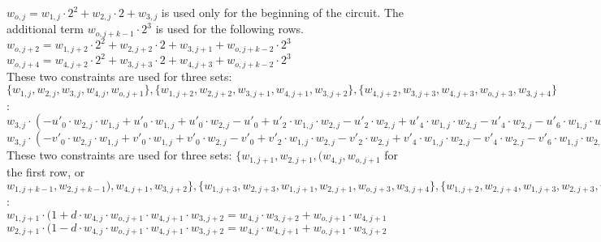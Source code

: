 \begin{center}
$w_{o, j } = w_{1,j} \cdot 2^2 + w_{2,j} \cdot 2 + w_{3, j}$ is used only for the beginning of the circuit. The additional term $w_{o, j+k - 1} \cdot 2^3$ is used for the following rows. \\
$w_{o, j + 2} = w_{1,j + 2} \cdot 2^2 + w_{2,j + 2} \cdot 2 + w_{3, j + 1} + w_{o, j+k - 2} \cdot 2^3$ \\
$w_{o, j + 4} = w_{4,j + 2} \cdot 2^2 + w_{3,j + 3} \cdot 2 + w_{4, j + 3} + w_{o, j+k - 2} \cdot 2^3$ \\


These two constraints are used for three sets: $\{ w_{1,j}, w_{2,j}, w_{3,j}, w_{4,j}, w_{o, j+1} \}, \{ w_{1, j+2}, w_{2, j +2}, w_{3, j+1}, w_{4, j+1}, w_{3, j+2}\}, \{w_{4,j+2}, w_{3,j+3}, w_{4, j+3},w_{o, j+3}, w_{3, j+4} \}$: \\
$w_{3, j} \cdot (-u'_0 \cdot w_{2, j} \cdot w_{1, j} + u'_0 \cdot w_{1, j} + u'_0 \cdot w_{2, j} - u'_0 + u'_2 \cdot w_{1, j}\cdot w_{2, j} - u'_2\cdot w_{2, j} + u'_4 \cdot w_{1, j}\cdot w_{2, j} - u'_4\cdot w_{2, j} -u'_6 \cdot w_{1, j} \cdot w_{2, j} + u'_1 \cdot w_{2, j} \cdot w_{1, j} - u'_1 \cdot w_{1, j} - u'_1 \cdot w_{2, j} + u'_1  - u'_3 \cdot w_{1, j}\cdot w_{2, j} + u'_3\cdot w_{2, j} - u'_5 \cdot w_{1, j}\cdot w_{2, j} + u'_5\cdot w_{2, j} + u'_7 \cdot w_{1, j} \cdot w_{2, j}) = w_{4,j} -u'_0 \cdot w_{2, j} \cdot w_{1, j} + u'_0 \cdot w_{1, j} + u'_0 \cdot w_{2, j} - u'_0 + u'_2 \cdot w_{1, j}\cdot w_{2, j} - u'_2\cdot w_{2, j} + u'_4 \cdot w_{1, j}\cdot w_{2, j} - u'_4\cdot w_{2, j} -u'_6 \cdot w_{1, j} \cdot w_{2, j} $ \\

$w_{3, j} \cdot (-v'_0 \cdot w_{2, j} \cdot w_{1, j} + v'_0 \cdot w_{1, j} + v'_0 \cdot w_{2, j} - v'_0 + v'_2 \cdot w_{1, j}\cdot w_{2, j} -v'_2\cdot w_{2, j} + v'_4 \cdot w_{1, j}\cdot w_{2, j} - v'_4\cdot w_{2, j} -v'_6 \cdot w_{1, j} \cdot w_{2, j} + v'_1 \cdot w_{2, j} \cdot w_{1, j} - v'_1 \cdot w_{1, j} - v'_1 \cdot w_{2, j} + v'_1  - v'_3 \cdot w_{1, j}\cdot w_{2, j} + v'_3\cdot w_{2, j} - v'_5 \cdot w_{1, j}\cdot w_{2, j} + v'_5\cdot w_{2, j} + v'_7 \cdot w_{1, j} \cdot w_{2, j}) = w_{o,j+1} - v'_0 \cdot w_{2, j} \cdot w_{1, j} + v'_0 \cdot w_{1, j} + v'_0 \cdot w_{2, j} - v'_0 + v'_2 \cdot w_{1, j}\cdot w_{2, j} - v'_2\cdot w_{2, j} + v'_4 \cdot w_{1, j}\cdot w_{2, j} - v'_4\cdot w_{2, j} - v'_6 \cdot w_{1, j} \cdot w_{2, j} $ \\

These two constraints are used for three sets: $\{ w_{1,j+1}, w_{2,j+1}, ( w_{4,j}, w_{o,j+1}$  for the first row, or $w_{1, j + k - 1}, w_{2, j + k - 1}), w_{4, j+1}, w_{3,j+2} \}, \{ w_{1, j+3}, w_{2, j +3}, w_{1, j+1}, w_{2, j+1}, w_{o, j+3}, w_{3, j+4}\}, \{w_{1,j+2}, w_{2,j+4}, w_{1, j+3},w_{2, j+3}, w_{4, j+5}, w_{o,j+6} \}$: \\
$w_{1, j+1} \cdot (1 + d \cdot w_{4,j} \cdot w_{o,j+1} \cdot w_{4,j+1} \cdot w_{3, j+2} = w_{4,j} \cdot w_{3, j+2} + w_{o,j+1} \cdot w_{4,j+1}$
$w_{2, j+1} \cdot (1 - d \cdot w_{4,j} \cdot w_{o,j+1} \cdot w_{4,j+1} \cdot w_{3, j+2} = w_{4,j} \cdot w_{4, j+1} + w_{o,j+1} \cdot w_{3,j+2}$

\end{center}

